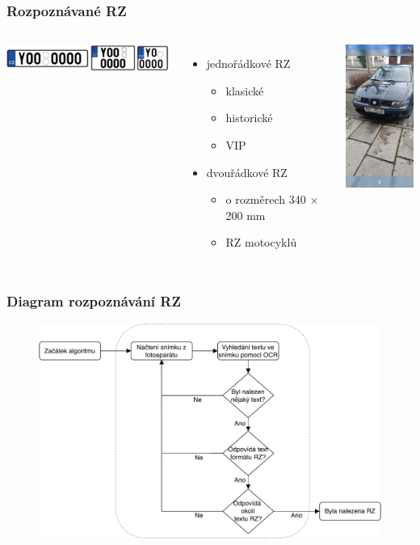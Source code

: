 \documentclass{beamer}
\begin{document}
\begin{frame}
    \frametitle{Rozpoznávané RZ}
    \begin{columns}
    \begin{center}
    {\includegraphics[width=6.8cm]{img/simple-vrp-czech.png}}
    \end{center}
    \begin{itemize}
        \item jednořádkové RZ
        \begin{itemize}
            \item klasické
            \item historické
            \item VIP
        \end{itemize}
        \item dvouřádkové RZ
        \begin{itemize}
            \item o rozměrech 340 $\times$ 200 mm
            \item RZ motocyklů
        \end{itemize}
    \end{itemize}
{\includegraphics[width=2.8cm]{img/screen_2.jpeg}}

    \end{columns} 
\end{frame}

\begin{frame}
\frametitle{Diagram rozpoznávání RZ}
\begin{figure}[!ht]
\centering
{\includegraphics[width=11.5cm]{pdf/vrp_recognition.pdf}}
\end{figure}

\end{frame}
\end{document}

